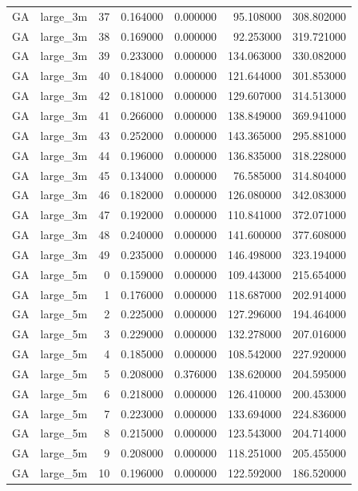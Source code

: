 \begin{tabular}{llrrrrr}
GA & large_3m & 37 & 0.164000 & 0.000000 & 95.108000 & 308.802000 \\
GA & large_3m & 38 & 0.169000 & 0.000000 & 92.253000 & 319.721000 \\
GA & large_3m & 39 & 0.233000 & 0.000000 & 134.063000 & 330.082000 \\
GA & large_3m & 40 & 0.184000 & 0.000000 & 121.644000 & 301.853000 \\
GA & large_3m & 42 & 0.181000 & 0.000000 & 129.607000 & 314.513000 \\
GA & large_3m & 41 & 0.266000 & 0.000000 & 138.849000 & 369.941000 \\
GA & large_3m & 43 & 0.252000 & 0.000000 & 143.365000 & 295.881000 \\
GA & large_3m & 44 & 0.196000 & 0.000000 & 136.835000 & 318.228000 \\
GA & large_3m & 45 & 0.134000 & 0.000000 & 76.585000 & 314.804000 \\
GA & large_3m & 46 & 0.182000 & 0.000000 & 126.080000 & 342.083000 \\
GA & large_3m & 47 & 0.192000 & 0.000000 & 110.841000 & 372.071000 \\
GA & large_3m & 48 & 0.240000 & 0.000000 & 141.600000 & 377.608000 \\
GA & large_3m & 49 & 0.235000 & 0.000000 & 146.498000 & 323.194000 \\
GA & large_5m & 0 & 0.159000 & 0.000000 & 109.443000 & 215.654000 \\
GA & large_5m & 1 & 0.176000 & 0.000000 & 118.687000 & 202.914000 \\
GA & large_5m & 2 & 0.225000 & 0.000000 & 127.296000 & 194.464000 \\
GA & large_5m & 3 & 0.229000 & 0.000000 & 132.278000 & 207.016000 \\
GA & large_5m & 4 & 0.185000 & 0.000000 & 108.542000 & 227.920000 \\
GA & large_5m & 5 & 0.208000 & 0.376000 & 138.620000 & 204.595000 \\
GA & large_5m & 6 & 0.218000 & 0.000000 & 126.410000 & 200.453000 \\
GA & large_5m & 7 & 0.223000 & 0.000000 & 133.694000 & 224.836000 \\
GA & large_5m & 8 & 0.215000 & 0.000000 & 123.543000 & 204.714000 \\
GA & large_5m & 9 & 0.208000 & 0.000000 & 118.251000 & 205.455000 \\
GA & large_5m & 10 & 0.196000 & 0.000000 & 122.592000 & 186.520000 \\

\end{tabular}
